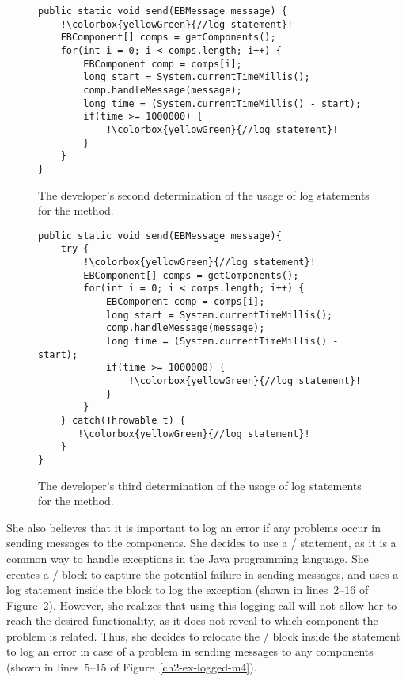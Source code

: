\begin{figure}[p]
\def\baselinestretch{1}
\begin{lstlisting}[escapechar=!]
public static void send(EBMessage message) {
    !\colorbox{yellowGreen}{//log statement}!
    EBComponent[] comps = getComponents();
    for(int i = 0; i < comps.length; i++) {
        EBComponent comp = comps[i];
        long start = System.currentTimeMillis();
        comp.handleMessage(message);
        long time = (System.currentTimeMillis() - start);
        if(time >= 1000000) {
            !\colorbox{yellowGreen}{//log statement}!
        }
    }
}
\end{lstlisting}
\caption[The developer's second determination of the usage of log statements.]{The developer's second determination of the usage of log statements for the  method.\label{ch2-ex-logged-m2}}
\end{figure}

\begin{figure}[p]
\def\baselinestretch{1}
\begin{lstlisting}[escapechar=!]
public static void send(EBMessage message){
    try {
        !\colorbox{yellowGreen}{//log statement}!
        EBComponent[] comps = getComponents();
        for(int i = 0; i < comps.length; i++) {
            EBComponent comp = comps[i];
            long start = System.currentTimeMillis();
            comp.handleMessage(message);
            long time = (System.currentTimeMillis() - start);
            if(time >= 1000000) {
                !\colorbox{yellowGreen}{//log statement}!
            }
        }
    } catch(Throwable t) {
       !\colorbox{yellowGreen}{//log statement}!
    }
}
\end{lstlisting}
\caption[The developer's third determination of the usage of log statements.]{The developer's third determination of the usage of log statements for the  method.\label{ch2-ex-logged-m3}}
\end{figure}

She also believes that it is important to log an error if any problems occur in sending messages to the components. She decides to use a / statement, as it is a common way to handle exceptions in the Java programming language. She creates a / block to capture the potential failure in sending messages, and uses a log statement inside the  block to log the exception (shown in lines~2--16 of Figure~\ref{ch2-ex-logged-m3}). However, she realizes that using this logging call will not allow her to reach the desired functionality, as it does not reveal to which component the problem is related. Thus, she decides to relocate the / block inside the  statement to log an error in case of a problem in sending messages to any components (shown in lines~5--15 of Figure~\ref{ch2-ex-logged-m4}).


